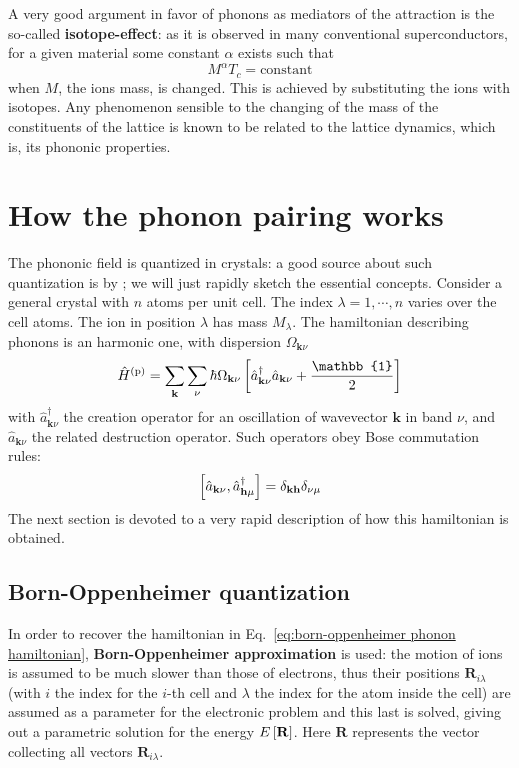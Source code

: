 A very good argument in favor of phonons as mediators of the attraction is the so-called \textbf{isotope-effect}: as it is observed in many conventional superconductors, for a given material some constant $\alpha$ exists such that 
\[
	M^\alpha T_c = \mathrm{constant}
\]
when $M$, the ions mass, is changed. This is achieved by substituting the ions with isotopes. Any phenomenon sensible to the changing of the mass of the constituents of the lattice is known to be related to the lattice dynamics, which is, its phononic properties.

\section{How the phonon pairing works}

The phononic field is quantized in crystals: a good source about such quantization is  \cite{grosso2000solid} by \citeauthor{grosso2000solid}; we will just rapidly sketch the essential concepts.
Consider a general crystal with $n$ atoms per unit cell. The index $\lambda = 1,\cdots,n$ varies over the cell atoms. The ion in position $\lambda$ has mass $M_\lambda$. The hamiltonian describing phonons is an harmonic one, with dispersion $\Omega_{\mathbf{k}\nu}$
\begin{equation}\label{eq:born-oppenheimer phonon hamiltonian}
	\hat H^{(\mathrm{p})} = \sum_\mathbf{k} \sum_\nu  \hbar \Omega_{\mathbf{k}\nu} \lrS{\hat a_{\mathbf{k}\nu}^\dagger \hat a_{\mathbf{k}\nu} + \frac{\mathbb{1}}{2}}
\end{equation}
with $\hat a_{\mathbf{k}\nu}^\dagger$ the creation operator for an oscillation of wavevector $\mathbf{k}$ in band $\nu$, and $\hat a_{\mathbf{k}\nu}$ the related destruction operator.  Such operators obey Bose commutation rules:
\[
	\comm{\hat a_{\mathbf{k}\nu}}{ \hat a_{\mathbf{h}\mu}^\dagger} = \delta_{\mathbf{k}\mathbf{h}}
	\delta_{\nu\mu}
\]
The next section is devoted to a very rapid description of how this hamiltonian is obtained.

\subsection{Born-Oppenheimer quantization}

In order to recover the hamiltonian in Eq.~\eqref{eq:born-oppenheimer phonon hamiltonian}, \textbf{Born-Oppenheimer approximation} is used: the motion of ions is assumed to be much slower than those of electrons, thus their positions $\mathbf{R}_{i\lambda}$ (with $i$ the index for the $i$-th cell and $\lambda$ the index for the atom inside the cell) are assumed as a parameter for the electronic problem and this last is solved, giving out a parametric solution for the energy $E\left[{\mathbf{R}}\right]$. Here $\mathbf{R}$ represents the vector collecting all vectors $\mathbf{R}_{i\lambda}$.

